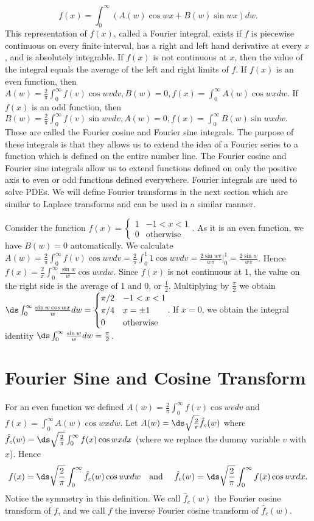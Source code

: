 $$f(x) = \int_{0}^\infty \left(A(w) \cos w x+B(w)\sin w x\right)dw.$$  
This representation of $f(x)$, called a Fourier integral, exists if $f$ is piecewise continuous on every finite interval, has a right and left hand derivative at every $x$, and is absolutely integrable.  If $f(x)$ is not continuous at $x$, then the value of the integral equals the average of the left and right limits of $f$. 
If $f(x)$ is an even function, then $A(w) = \frac{2}{\pi}\int_{0}^{\infty} f(v)\cos w v dv, B(w)=0, f(x) = \int_{0}^\infty A(w) \cos w xdw.$
If $f(x)$ is an odd function, then $B(w) = \frac{2}{\pi}\int_{0}^{\infty} f(v)\sin w v dv, A(w)=0, f(x) = \int_{0}^\infty B(w) \sin w xdw.$
These are called the Fourier cosine and Fourier sine integrals.  
The purpose of these integrals is that they allows us to extend the idea of a Fourier series to a function which is defined on the entire number line.  The Fourier cosine and Fourier sine integrals allow us to extend functions defined on only the positive axis to even or odd functions defined everywhere. Fourier integrals are used to solve PDEs.  We will define Fourier transforms in the next section which are similar to Laplace transforms and can be used in a similar manner.

Consider the function $f(x) = \begin{cases}1& -1<x<1\\0&\text{otherwise}\end{cases}$. As it is an even function, we have $B(w)=0$ automatically.  We calculate $A(w) = \frac{2}{\pi}\int_0^{\infty}f(v)\cos wv dv = \frac{2}{\pi}\int_0^{1}1\cos wv dv = \frac{2\sin wv}{w\pi} \big|_0^{1} = \frac{2\sin w}{w\pi}$.  Hence $f(x) = \frac{2}{\pi}\int_0^\infty \frac{\sin w}{w}\cos wxdw$.  Since $f(x)$ is not continuous at $1$, the value on the right side is the average of 1 and 0, or $\frac12$.  Multiplying by $\frac{\pi}{2}$ we obtain $\ds\int_0^\infty \frac{\sin w\cos wx}{w}dw=\begin{cases}\pi/2 & -1< x<1\\ \pi/4 & x=\pm 1\\ 0 &\text{otherwise}\end{cases}$. If $x=0$, we obtain the integral identity $\ds\int_0^\infty \frac{\sin w}{w}dw = \frac{\pi}{2}$. 





\section{Fourier Sine and Cosine Transform}
For an even function we defined $A(w) = \frac{2}{\pi}\int_{0}^{\infty} f(v)\cos w v dv$ and $f(x) = \int_{0}^\infty A(w) \cos w xdw.$ Let $A(w) =\ds\sqrt{\frac{2}{\pi}}\hat f_c (w)$ where $\hat f_c(w) = \ds\sqrt{\frac{2}{\pi}}\int_{0}^{\infty} f(x)\cos w x dx$ (where we replace the dummy variable $v$ with $x$). Hence $$ f(x) = \ds\sqrt{\frac{2}{\pi}}\int_{0}^{\infty} \hat f_c(w)\cos w x dw \ \ \text{ and }\ \ \ \hat f_c(w) = \ds\sqrt{\frac{2}{\pi}}\int_{0}^{\infty} f(x)\cos w x dx.$$ 
Notice the symmetry in this definition.  We call $\hat f_c(w)$ the Fourier cosine transform of $f$, and we call $f$ the inverse Fourier cosine transform of $\hat f_c(w)$.  

